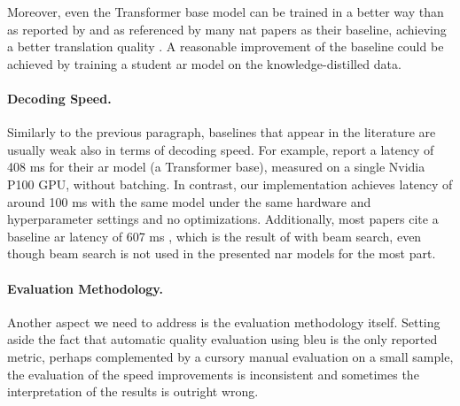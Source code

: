 Moreover, even the Transformer base model can be trained in a better way than
as reported by \citet{vaswani2017attention} and as referenced by many \ac{nat}
papers as their baseline, achieving a better translation quality
\citep{popel-bojar-2018-training}. A reasonable improvement of the baseline
could be achieved by training a student \ac{ar} model on the
knowledge-distilled data.

\paragraph{Decoding Speed.} Similarly to the previous paragraph, baselines that
appear in the literature are usually weak also in terms of decoding speed.  For
example, \citet{gu2017nonautoregressive} report a latency of 408 ms for their
\ac{ar} model (a Transformer base), measured on a single Nvidia P100 GPU,
without batching. In contrast, our implementation achieves latency of around
100 ms with the same model under the same hardware and hyperparameter settings
and no optimizations. Additionally, most papers cite a baseline \ac{ar} latency
of 607 ms , which is the result of
\citet{gu2017nonautoregressive} with beam search, even though beam search is
not used in the presented \ac{nar} models for the most part.




\paragraph{Evaluation Methodology.} Another aspect we need to address is the
evaluation methodology itself. Setting aside the fact that automatic quality
evaluation using \acs{bleu} is the only reported metric, perhaps complemented
by a cursory manual evaluation on a small sample, the evaluation of the speed
improvements is inconsistent and sometimes the interpretation of the results is
outright wrong.


